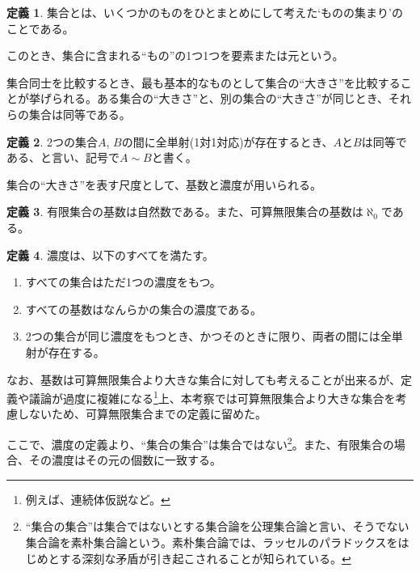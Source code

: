 \documentclass[10pt, a5paper, twoside]{jsarticle}
\theoremstyle{definition}
\newtheorem{dfn}{定義}
\begin{document}
			\begin{dfn}
				
				集合とは、いくつかのものをひとまとめにして考えた‘ものの集まり’のことである\cite{matsu}。

			\end{dfn}

			このとき、集合に含まれる“もの”の1つ1つを要素または元という。


			集合同士を比較するとき、最も基本的なものとして集合の“大きさ”を比較することが挙げられる。ある集合の“大きさ”と、別の集合の“大きさ”が同じとき、それらの集合は同等である。

			\begin{dfn}
				
				2つの集合$A$, $B$の間に全単射(1対1対応)が存在するとき、$A$と$B$は同等である、と言い、記号で$A \sim B$と書く\cite{hara}。

			\end{dfn}


			集合の“大きさ”を表す尺度として、基数と濃度が用いられる。

			\begin{dfn}
				
				有限集合の基数は自然数である。また、可算無限集合の基数は$\aleph_0$である。

			\end{dfn}

			\begin{dfn}

				濃度は、以下のすべてを満たす\cite{nlab}。
				
				\begin{enumerate}
					\item すべての集合はただ1つの濃度をもつ。
					\item すべての基数はなんらかの集合の濃度である。
					\item 2つの集合が同じ濃度をもつとき、かつそのときに限り、両者の間には全単射が存在する。
				\end{enumerate}

			\end{dfn}

			なお、基数は可算無限集合より大きな集合に対しても考えることが出来るが、定義や議論が過度に複雑になる\footnote{例えば、連続体仮説など。}上、本考察では可算無限集合より大きな集合を考慮しないため、可算無限集合までの定義に留めた。

			ここで、濃度の定義より、“集合の集合”は集合ではない\footnote{“集合の集合”は集合ではないとする集合論を公理集合論と言い、そうでない集合論を素朴集合論という。素朴集合論では、ラッセルのパラドックスをはじめとする深刻な矛盾が引き起こされることが知られている。}。また、有限集合の場合、その濃度はその元の個数に一致する。
\end{document}
